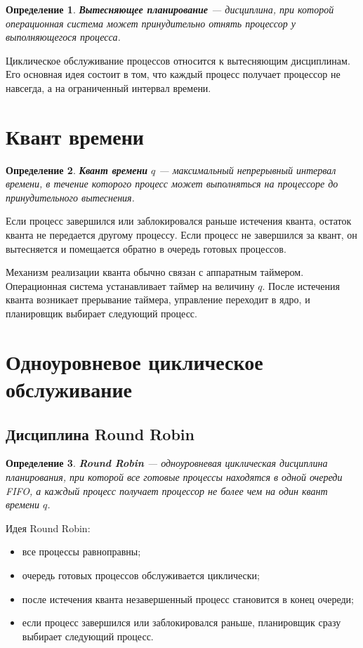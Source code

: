 \documentclass[12pt,a4paper]{article}
\newtheorem{definition}{Определение}
\begin{document}
\begin{definition}
\textbf{Вытесняющее планирование} --- дисциплина, при которой операционная система может принудительно отнять процессор у выполняющегося процесса.
\end{definition}

Циклическое обслуживание процессов относится к вытесняющим дисциплинам. Его основная идея состоит в том, что каждый процесс получает процессор не навсегда, а на ограниченный интервал времени.

\section{Квант времени}

\begin{definition}
\textbf{Квант времени} $q$ --- максимальный непрерывный интервал времени, в течение которого процесс может выполняться на процессоре до принудительного вытеснения.
\end{definition}

Если процесс завершился или заблокировался раньше истечения кванта, остаток кванта не передается другому процессу. Если процесс не завершился за квант, он вытесняется и помещается обратно в очередь готовых процессов.

Механизм реализации кванта обычно связан с аппаратным таймером. Операционная система устанавливает таймер на величину $q$. После истечения кванта возникает прерывание таймера, управление переходит в ядро, и планировщик выбирает следующий процесс.

\section{Одноуровневое циклическое обслуживание}

\subsection{Дисциплина Round Robin}

\begin{definition}
\textbf{Round Robin} --- одноуровневая циклическая дисциплина планирования, при которой все готовые процессы находятся в одной очереди FIFO, а каждый процесс получает процессор не более чем на один квант времени $q$.
\end{definition}

Идея Round Robin:
\begin{itemize}
    \item все процессы равноправны;
    \item очередь готовых процессов обслуживается циклически;
    \item после истечения кванта незавершенный процесс становится в конец очереди;
    \item если процесс завершился или заблокировался раньше, планировщик сразу выбирает следующий процесс.
\end{itemize}
\end{document}
